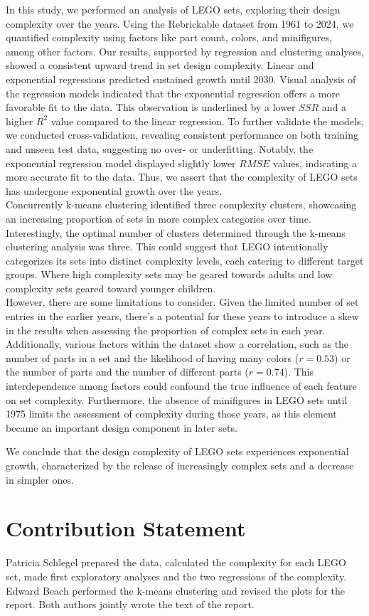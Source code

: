 \documentclass{article}
\theoremstyle{plain}
\theoremstyle{definition}
\theoremstyle{remark}
\begin{document}
In this study, we performed an analysis of LEGO sets, exploring their design complexity over the years. Using the Rebrickable dataset from 1961 to 2024, we quantified complexity using factors like part count, colors, and minifigures, among other factors. Our results, supported by regression and clustering analyses, showed a consistent upward trend in set design complexity. Linear and exponential regressions predicted sustained growth until 2030. Visual analysis of the regression models indicated that the exponential regression offers a more favorable fit to the data. This observation is underlined by a lower $SSR$ and a higher $R^2$ value compared to the linear regression. To further validate the models, we conducted cross-validation, revealing consistent performance on both training and unseen test data, suggesting no over- or underfitting. Notably, the exponential regression model displayed slightly lower $RMSE$ values, indicating a more accurate fit to the data. Thus, we assert that the complexity of LEGO sets has undergone exponential growth over the years. \\
Concurrently k-means clustering identified three complexity clusters, showcasing an increasing proportion of sets in more complex categories over time. Interestingly, the optimal number of clusters determined through the k-means clustering analysis was three. This could suggest that LEGO intentionally categorizes its sets into distinct complexity levels, each catering to different target groups. Where high complexity sets may be geared towards adults and low complexity sets geared toward younger children.\\
However, there are some limitations to consider. Given the limited number of set entries in the earlier years, there's a potential for these years to introduce a skew in the results when assessing the proportion of complex sets in each year. Additionally, various factors within the dataset show a correlation, such as the number of parts in a set and the likelihood of having many colors ($r=0.53$) or the number of parts and the number of different parts ($r=0.74$). This interdependence among factors could confound the true influence of each feature on set complexity. Furthermore, the absence of minifigures in LEGO sets until 1975 limits the assessment of complexity during those years, as this element became an important design component in later sets.
 
We conclude that the design complexity of LEGO sets experiences exponential growth, characterized by the release of increasingly complex sets and a decrease in simpler ones.

\section*{Contribution Statement}

Patricia Schlegel prepared the data, calculated the complexity for each LEGO set, made first exploratory analyses and the two regressions of the complexity. Edward Beach performed the k-means clustering and revised the plots for the report. Both authors jointly wrote the text of the report.




\end{document}
